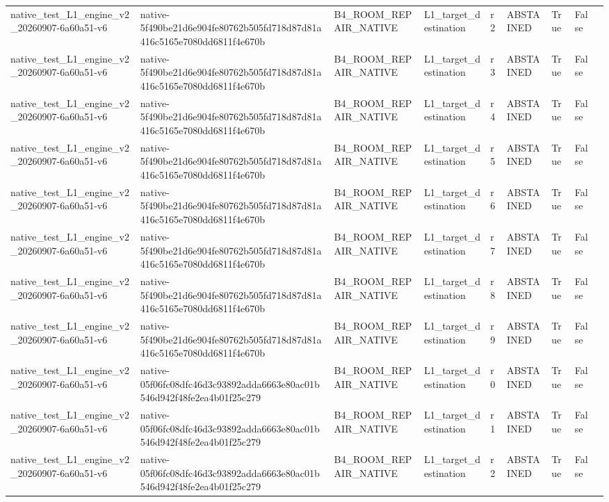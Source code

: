 \begin{tabular}{lllllllll}
native\_test\_L1\_engine\_v2\_20260907-6a60a51-v6 & native-5f490be21d6e904fe80762b505fd718d87d81a416c5165e7080dd6811f4e670b & B4\_ROOM\_REPAIR\_NATIVE & L1\_target\_destination & r2 & ABSTAINED & True & False &  \\
native\_test\_L1\_engine\_v2\_20260907-6a60a51-v6 & native-5f490be21d6e904fe80762b505fd718d87d81a416c5165e7080dd6811f4e670b & B4\_ROOM\_REPAIR\_NATIVE & L1\_target\_destination & r3 & ABSTAINED & True & False &  \\
native\_test\_L1\_engine\_v2\_20260907-6a60a51-v6 & native-5f490be21d6e904fe80762b505fd718d87d81a416c5165e7080dd6811f4e670b & B4\_ROOM\_REPAIR\_NATIVE & L1\_target\_destination & r4 & ABSTAINED & True & False &  \\
native\_test\_L1\_engine\_v2\_20260907-6a60a51-v6 & native-5f490be21d6e904fe80762b505fd718d87d81a416c5165e7080dd6811f4e670b & B4\_ROOM\_REPAIR\_NATIVE & L1\_target\_destination & r5 & ABSTAINED & True & False &  \\
native\_test\_L1\_engine\_v2\_20260907-6a60a51-v6 & native-5f490be21d6e904fe80762b505fd718d87d81a416c5165e7080dd6811f4e670b & B4\_ROOM\_REPAIR\_NATIVE & L1\_target\_destination & r6 & ABSTAINED & True & False &  \\
native\_test\_L1\_engine\_v2\_20260907-6a60a51-v6 & native-5f490be21d6e904fe80762b505fd718d87d81a416c5165e7080dd6811f4e670b & B4\_ROOM\_REPAIR\_NATIVE & L1\_target\_destination & r7 & ABSTAINED & True & False &  \\
native\_test\_L1\_engine\_v2\_20260907-6a60a51-v6 & native-5f490be21d6e904fe80762b505fd718d87d81a416c5165e7080dd6811f4e670b & B4\_ROOM\_REPAIR\_NATIVE & L1\_target\_destination & r8 & ABSTAINED & True & False &  \\
native\_test\_L1\_engine\_v2\_20260907-6a60a51-v6 & native-5f490be21d6e904fe80762b505fd718d87d81a416c5165e7080dd6811f4e670b & B4\_ROOM\_REPAIR\_NATIVE & L1\_target\_destination & r9 & ABSTAINED & True & False &  \\
native\_test\_L1\_engine\_v2\_20260907-6a60a51-v6 & native-05f06fc08dfc46d3c93892adda6663e80ac01b546d942f48fe2ea4b01f25c279 & B4\_ROOM\_REPAIR\_NATIVE & L1\_target\_destination & r0 & ABSTAINED & True & False &  \\
native\_test\_L1\_engine\_v2\_20260907-6a60a51-v6 & native-05f06fc08dfc46d3c93892adda6663e80ac01b546d942f48fe2ea4b01f25c279 & B4\_ROOM\_REPAIR\_NATIVE & L1\_target\_destination & r1 & ABSTAINED & True & False &  \\
native\_test\_L1\_engine\_v2\_20260907-6a60a51-v6 & native-05f06fc08dfc46d3c93892adda6663e80ac01b546d942f48fe2ea4b01f25c279 & B4\_ROOM\_REPAIR\_NATIVE & L1\_target\_destination & r2 & ABSTAINED & True & False &  \\

\end{tabular}
